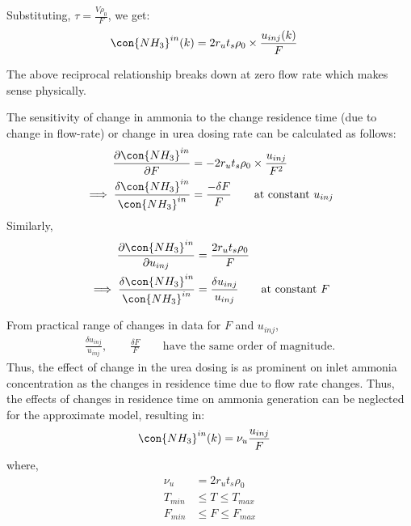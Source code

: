 Substituting, $\tau = \frac{V \rho_0}{F}$, we get:
\begin{align}
    \con{NH_3}^{in} (k) &= 2r_u t_s \rho_0 \times \frac{u_{inj}(k)}{F}
\end{align}

The above reciprocal relationship breaks down at zero flow rate which makes sense physically.

The sensitivity of change in ammonia to the change residence time (due to change in flow-rate) or change in urea dosing rate can be calculated as follows:
\begin{align*}
    \frac{\partial \con{NH_3}^{in} }{\partial F} &= -2 r_u t_s \rho_0 \times \frac{u_{inj}}{F^2} \\
    \implies \frac{\delta \con{NH_3}^{in}}{\con{NH_3}^{in}} &= \frac{-\delta F}{F}
    \qquad \text{at constant } u_{inj}
\end{align*}
Similarly,
\begin{align*}
    \frac{\partial \con{NH_3}^{in} }{\partial u_{inj}} &= \frac{2 r_u t_s \rho_0}{F} \\
    \implies \frac{\delta \con{NH_3}^{in}}{\con{NH_3}^{in}} &= \frac{ \delta u_{inj}}{u_{inj}} \qquad \text{at constant } F
\end{align*}

From practical range of changes in data for $F$ and $u_{inj}$,
\begin{align*}
    \frac{ \delta u_{inj}}{u_{inj}}, \qquad \frac{\delta F}{F} \qquad \text{have the same order of magnitude.}
\end{align*}
Thus, the effect of change in the urea dosing is as prominent on inlet ammonia concentration as the changes in residence time due to flow rate changes. Thus, the effects of changes in residence time on ammonia generation can be neglected for the approximate model, resulting in:
\begin{align}
    \con{NH_3}^{in}(k) &= \nu_u \frac{u_{inj}}{F}    \label{eqn::urea_inj}
\end{align}
where,
\begin{align*}
    \nu_u &= 2 r_u t_s \rho_0\\
    T_{min} &\leq T \leq T_{max}\\
    F_{min} &\leq F \leq F_{max}
\end{align*}
